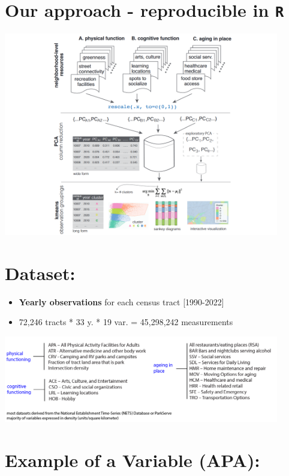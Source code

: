 \documentclass[
  letterpaper,
  DIV=11,
  numbers=noendperiod]{scrartcl}
\providecommand{\tightlist}{%
  \setlength{\itemsep}{0pt}\setlength{\parskip}{0pt}}\usepackage{longtable,booktabs,array}
\begin{document}
\hypertarget{our-approach---reproducible-in-r}{%
\section{\texorpdfstring{Our approach - reproducible in
\texttt{R}}{Our approach - reproducible in R}}\label{our-approach---reproducible-in-r}}

\includegraphics[width=0.9\textwidth,height=\textheight]{imgs/process.png}

\hypertarget{dataset}{%
\section{Dataset:}\label{dataset}}

\begin{itemize}
\tightlist
\item
  \textbf{Yearly observations} for each census tract {[}1990-2022{]}
\item
  72,246 tracts * 33 y. * 19 var. = 45,298,242 measurements
\end{itemize}

\includegraphics[width=0.9\textwidth,height=\textheight]{imgs/datasets.png}

\hypertarget{example-of-a-variable-apa}{%
\section{Example of a Variable (APA):}\label{example-of-a-variable-apa}}
\end{document}
